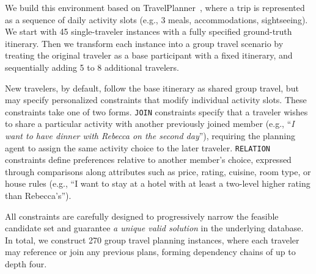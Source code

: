 We build this environment based on TravelPlanner~\citep{xie2024travelplanner}, where a trip is represented as a sequence of daily activity slots (e.g., 3 meals, accommodations, sightseeing). We start with 45 single-traveler instances with a fully specified ground-truth itinerary. Then we transform each instance into a group travel scenario by treating the original traveler as a base participant with a fixed itinerary, and sequentially adding 5 to 8 additional travelers.

New travelers, by default, follow the base itinerary as shared group travel, but may specify personalized constraints that modify individual activity slots. These constraints take one of two forms. \texttt{JOIN} constraints specify that a traveler wishes to share a particular activity with another previously joined member (e.g., ``\textit{I want to have dinner with Rebecca on the second day}''), requiring the planning agent to assign the same activity choice to the later traveler. \texttt{RELATION} constraints define preferences relative to another member’s choice, expressed through comparisons along attributes such as price, rating, cuisine, room type, or house rules (e.g., ``I want to stay at a hotel with at least a two-level higher rating than Rebecca’s'').

All constraints are carefully designed to progressively narrow the feasible candidate set and guarantee \textit{a unique valid solution} in the underlying database. In total, we construct 270 group travel planning instances, where each traveler may reference or join any previous plans, forming dependency chains of up to depth four.



